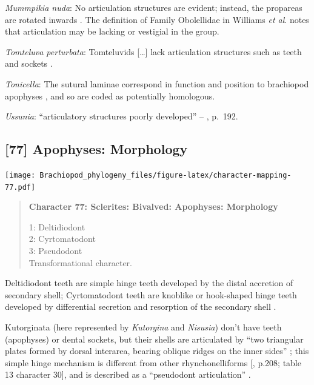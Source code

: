 \documentclass[openany]{book}
\begin{document}
\hypertarget{Mummpikia_nuda-coding-76}{}
\emph{Mummpikia nuda}: No articulation structures are evident; instead,
the propareas are rotated inwards \citep{Balthasar2008iMummpikia}. The
definition of Family Obolellidae in Williams \emph{et al}.
\citeyearpar{Williams2000LinguliformeaCraniiformea} notes that
articulation may be lacking or vestigial in the group.

\hypertarget{Tomteluva_perturbata-coding-76}{}
\emph{Tomteluva perturbata}: Tomteluvids {[}\ldots{}{]} lack
articulation structures such as teeth and sockets
\citep{Streng2016Anew}.

\hypertarget{Tonicella-coding-76}{}
\emph{Tonicella}: The sutural laminae correspond in function and
position to brachiopod apophyses \citep{Connors2012}, and so are coded
as potentially homologous.

\hypertarget{Ussunia-coding-76}{}
\emph{Ussunia}: ``articulatory structures poorly developed'' --
\citet{Williams2000LinguliformeaCraniiformea}, p.~192.

\subsection*{{[}77{]} Apophyses: Morphology}\label{apophyses-morphology}

\texttt{[image: Brachiopod\_phylogeny\_files/figure-latex/character-mapping-77.pdf]}

\begin{quote}
\textbf{Character 77: Sclerites: Bivalved: Apophyses: Morphology}

1: Deltidiodont\\
2: Cyrtomatodont\\
3: Pseudodont\\
Transformational character.
\end{quote}

Deltidiodont teeth are simple hinge teeth developed by the distal
accretion of secondary shell; Cyrtomatodont teeth are knoblike or
hook-shaped hinge teeth developed by differential secretion and
resorption of the secondary shell \citep[fig. 322
in][]{Williams1997Introduction}.

Kutorginata (here represented by \emph{Kutorgina} and \emph{Nisusia})
don't have teeth (apophyses) or dental sockets, but their shells are
articulated by ``two triangular plates formed by dorsal interarea,
bearing oblique ridges on the inner sides''
\citep[p.~211]{Williams2000LinguliformeaCraniiformea}; this simple hinge
mechanism is different from other rhynchonelliforms
{[}\citet{Williams2000LinguliformeaCraniiformea}, p.208; table 13
character 30{]}, and is described as a ``pseudodont articulation''
\citep{Holmer2018Evolutionarysignificance}.
\end{document}
